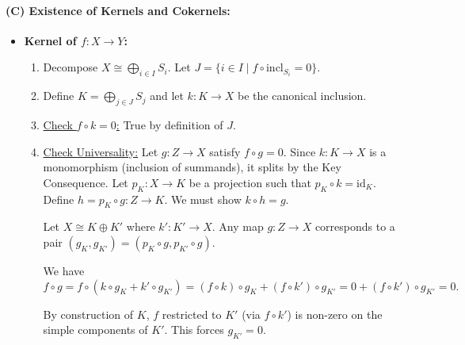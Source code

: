 \documentclass[11pt]{article}
\theoremstyle{definition}
\begin{document}
\paragraph{(C) Existence of Kernels and Cokernels:}
\begin{itemize}
  \item \textbf{Kernel of \(f: X \to Y\):}
    \begin{enumerate}
      \item Decompose \(X \cong \bigoplus_{i \in I} S_i\). Let \(J = \{ i \in I \mid f \circ \mathrm{incl}_{S_i} = 0 \}\).
      \item Define \(K = \bigoplus_{j \in J} S_j\) and let \(k: K \to X\) be the canonical inclusion.
      \item \underline{Check \(f \circ k = 0\):} True by definition of \(J\).
      \item \underline{Check Universality:} Let \(g: Z \to X\) satisfy \(f \circ g = 0\). Since \(k: K \to X\) is a monomorphism (inclusion of summands), it splits by the Key Consequence. Let \(p_K: X \to K\) be a projection such that \(p_K \circ k = \mathrm{id}_K\). Define \(h = p_K \circ g : Z \to K\). We must show \(k \circ h = g\).

        Let \(X \cong K \oplus K'\) where \(k': K' \to X\). Any map \(g: Z \to X\) corresponds to a pair \((g_K, g_{K'}) = (p_K \circ g, p_{K'} \circ g)\).

        We have 
        \[
          f \circ g = f \circ (k \circ g_K + k' \circ g_{K'}) = (f \circ k) \circ g_K + (f \circ k') \circ g_{K'} = 0 + (f \circ k') \circ g_{K'} = 0.
        \]

        By construction of \(K\), \(f\) restricted to \(K'\) (via \(f \circ k'\)) is non-zero on the simple components of \(K'\). This forces \(g_{K'} = 0\).


\end{enumerate}
\end{itemize}
\end{document}
